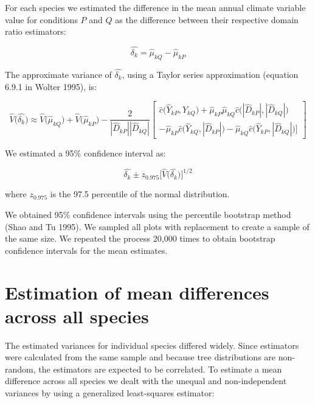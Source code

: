 \documentclass[12pt]{article}
\begin{document}
For each species we estimated the difference in the mean annual climate variable value for conditions $P$ and $Q$ as the difference between their respective domain ratio estimators:

 \begin{equation} \label{eq:delta}
\hat{\delta_k} = \hat\mu_{kQ} - \hat\mu_{kP}
\end{equation}

The approximate variance of $\hat{\delta_k}$, using a Taylor series approximation (equation 6.9.1 in Wolter 1995), is: 

 \begin{equation} \label{eq:grandvar}
\hat{V}\big(\hat{\delta_k}\big) \approx \hat{V}\big(\hat\mu_{kQ}\big) + \hat{V}\big(\hat\mu_{kP}\big) - \frac{2}{|\hat{D}_{kP}||\hat{D}_{kQ}|} 
\begin{bmatrix}  \hat{c}\big( \hat{Y}_{kP}, \hat{Y}_{kQ} \big) + \hat{\mu}_{kP}\hat{\mu}_{kQ}\hat{c}\big( |\hat{D}_{kP}|, |\hat{D}_{kQ}| \big) \\ - \hat{\mu}_{kP}\hat{c}\big( \hat{Y}_{kQ}, |\hat{D}_{kP}| \big)  - \hat{\mu}_{kQ}\hat{c}\big( \hat{Y}_{kP}, |\hat{D}_{kQ}| \big)  \Big]
\end{bmatrix}
\end{equation}

We estimated a 95\% confidence interval as:

\begin{equation} \label{eq:ci}
\hat{\delta_k} \pm z_{0.975} \Big[\hat{V}\Big(\hat{\delta_k} \Big)\Big]^{1/2}
\end{equation}

where $z_{0.975}$ is the 97.5 percentile of the normal distribution.  

We obtained 95\% confidence intervals using the percentile bootstrap method (Shao and Tu 1995).   We sampled all plots with replacement to create a sample of the same size.  We repeated the process 20,000 times to obtain bootstrap confidence intervals for the mean estimates. 

\section*{Estimation of mean differences across all species} 
The estimated variances for individual species differed widely.  Since estimators were calculated from the same sample and because tree distributions are non-random, the estimators are expected to be correlated.  To estimate a mean difference across all species we dealt with the unequal and non-independent variances by using a generalized least-squares estimator:
\end{document}
